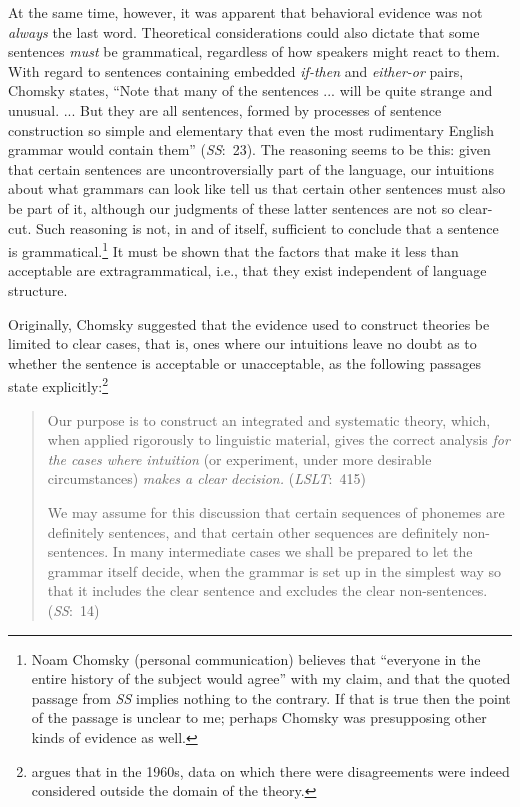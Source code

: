 At the same time, however, it was apparent that behavioral evidence was not \textit{always} the last word. Theoretical considerations could also dictate that some sentences \textit{must} be grammatical, regardless of how speakers might react to them. With regard to sentences containing embedded \textit{if-then} and \textit{either-or} pairs, Chomsky states, ``Note that many of the sentences ... will be quite strange and unusual. ... But they are all  sentences, formed by processes of sentence construction so simple and elementary that even the most rudimentary English grammar would contain them'' (\textit{SS}:~23). The reasoning seems to be this: given that
certain sentences are uncontroversially part of the language, our intuitions about what grammars can look like tell us that certain other sentences must also be part of it, although our judgments of these latter sentences are not so clear-cut. Such reasoning is not, in and of itself, sufficient to conclude that a sentence is grammatical.\footnote{Noam Chomsky (personal communication) believes that ``everyone in the entire history of the subject would agree'' with my claim, and that the quoted passage from \textit{SS} implies nothing to the contrary. If that is true then the point of the passage is unclear to me; perhaps Chomsky was presupposing other kinds of evidence as well.
} It must be shown that the factors that make it less than acceptable are extragrammatical, i.e., that they exist independent of language structure.

Originally, Chomsky suggested that the evidence used to construct theories be limited to clear cases, that is, ones where our intuitions leave no doubt as to whether the sentence is acceptable or unacceptable, as the following passages state explicitly:\footnote{\citet{Carden1973} argues that in the 1960s, data on which there were disagreements were indeed considered outside the domain of the theory.
}
\begin{quote}
Our purpose is to construct an integrated and systematic theory, which, when applied rigorously to linguistic material, gives the correct analysis \textit{for the cases where intuition} (or experiment, under more desirable circumstances) \textit{makes a clear decision.} (\textit{LSLT}:~415)

We may assume for this discussion that certain sequences of phonemes are definitely sentences, and that certain other sequences are definitely non-sentences. In many intermediate cases we shall be prepared to let the grammar itself decide, when the grammar is set up in the simplest way so that it includes the clear sentence and excludes the clear non-sentences. (\textit{SS}:~14)
 \end{quote}
 

